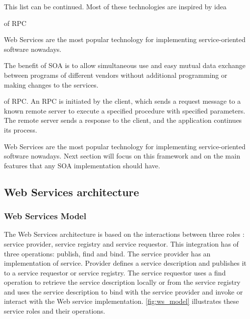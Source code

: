 This list can be continued. Most of these technologies are inspired by idea

of \gls{RPC}

Web Services are the most popular technology for implementing
service-oriented software nowadays.



 The benefit of SOA is
to allow simultaneous use and easy mutual data exchange between programs of different vendors without additional programming or making changes to the services.

of \gls{RPC}. An \gls{RPC} is initiated by the client, which sends a request
message to a known remote server to execute a specified procedure with specified
parameters. The remote server sends a response to the client, and the application continues its process.

Web Services are the most popular technology for implementing
service-oriented software nowadays. Next section will focus on this framework
and on the main features that any \gls{SOA} implementation should have.
 
\subsection{Web Services architecture}
\subsubsection{Web Services Model}
The Web Services architecture is based on the interactions between three
roles \cite{Kreger2001-WSC}:
service provider, service registry and service requestor. 
This integration has of three operations: publish, find and
bind. The service provider has an implementation of service. Provider defines a
service description and publishes it to a service requestor or service registry.
The service requestor uses a find operation to retrieve the service
description locally or from the service registry and uses the service description to bind with the
service provider and invoke or interact with the Web service implementation.
\autoref{fig:ws_model} illustrates these service roles and their operations.


